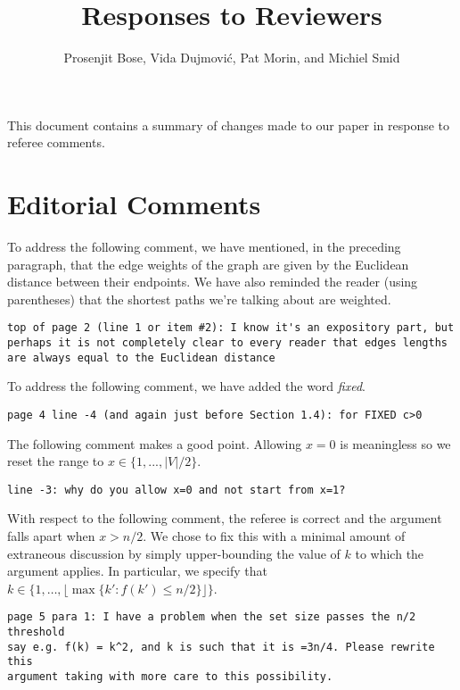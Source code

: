 \documentclass{patmorin}
\title{Responses to Reviewers}
\author{Prosenjit Bose, Vida Dujmovi\'c, Pat Morin, and Michiel Smid}
\begin{document}
\maketitle

This document contains a summary of changes made to our paper in response
to referee comments.  

\section{Editorial Comments}

To address the following comment, we have mentioned, in the preceding paragraph, that the edge weights of the graph are given by the Euclidean distance between their endpoints.  We have also reminded the reader (using parentheses) that the shortest paths we're talking about are weighted.

\begin{Verbatim}[frame=single]
top of page 2 (line 1 or item #2): I know it's an expository part, but 
perhaps it is not completely clear to every reader that edges lengths 
are always equal to the Euclidean distance 
\end{Verbatim}

To address the following comment, we have added the word \emph{fixed}.

\begin{Verbatim}[frame=single]
page 4 line -4 (and again just before Section 1.4): for FIXED c>0 
\end{Verbatim}

The following comment makes a good point.  Allowing $x=0$ is meaningless so we reset the range to $x\in\{1,...,|V|/2\}$.

\begin{Verbatim}[frame=single]
line -3: why do you allow x=0 and not start from x=1? 
\end{Verbatim}

With respect to the following comment, the referee is correct and the argument falls apart when $x>n/2$. We chose to fix this with a minimal amount of extraneous discussion by simply upper-bounding the value of $k$ to which the argument applies.  In particular, we specify that $k\in\{1,\ldots,\lfloor\max\{k':f(k')\le n/2\}\rfloor\}$.

\begin{Verbatim}[frame=single]
page 5 para 1: I have a problem when the set size passes the n/2 threshold 
say e.g. f(k) = k^2, and k is such that it is =3n/4. Please rewrite this 
argument taking with more care to this possibility.
\end{Verbatim}
\end{document}
